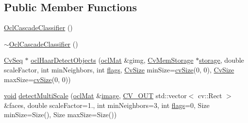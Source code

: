 \subsection*{Public Member Functions}
\begin{DoxyCompactItemize}
\item 
\hyperlink{classcv_1_1ocl_1_1OclCascadeClassifier_ade117594374a46fcc9eecf3c620258f9}{Ocl\-Cascade\-Classifier} ()
\item 
\hyperlink{classcv_1_1ocl_1_1OclCascadeClassifier_a3d1a54da195507ddc7e2070d9851602a}{$\sim$\-Ocl\-Cascade\-Classifier} ()
\item 
\hyperlink{structCvSeq}{Cv\-Seq} $\ast$ \hyperlink{classcv_1_1ocl_1_1OclCascadeClassifier_af61d8499080a6f7bc969df66ccb664ef}{ocl\-Haar\-Detect\-Objects} (\hyperlink{classcv_1_1ocl_1_1oclMat}{ocl\-Mat} \&gimg, \hyperlink{structCvMemStorage}{Cv\-Mem\-Storage} $\ast$\hyperlink{tracking_8hpp_af280dda601d192e49a9ae094198a7e16}{storage}, double scale\-Factor, int min\-Neighbors, int \hyperlink{highgui__c_8h_ae51e3a2d4365e85db9630dd3ce9508db}{flags}, \hyperlink{structCvSize}{Cv\-Size} min\-Size=\hyperlink{core_2types__c_8h_ad25ce7ac18665d5c9b062283ff0204ed}{cv\-Size}(0, 0), \hyperlink{structCvSize}{Cv\-Size} max\-Size=\hyperlink{core_2types__c_8h_ad25ce7ac18665d5c9b062283ff0204ed}{cv\-Size}(0, 0))
\item 
\hyperlink{legacy_8hpp_a8bb47f092d473522721002c86c13b94e}{void} \hyperlink{classcv_1_1ocl_1_1OclCascadeClassifier_a91f328ae48eec5ba94f9c2aef1962fe5}{detect\-Multi\-Scale} (\hyperlink{classcv_1_1ocl_1_1oclMat}{ocl\-Mat} \&\hyperlink{legacy_8hpp_ad62b16ab219ae2483e8a3d921c44cc97}{image}, \hyperlink{core_2types__c_8h_a4e999bc21cb894d3ed789f3f0bc26778}{C\-V\-\_\-\-O\-U\-T} std\-::vector$<$ cv\-::\-Rect $>$ \&faces, double scale\-Factor=1., int min\-Neighbors=3, int \hyperlink{highgui__c_8h_ae51e3a2d4365e85db9630dd3ce9508db}{flags}=0, Size min\-Size=Size(), Size max\-Size=Size())
\end{DoxyCompactItemize}


